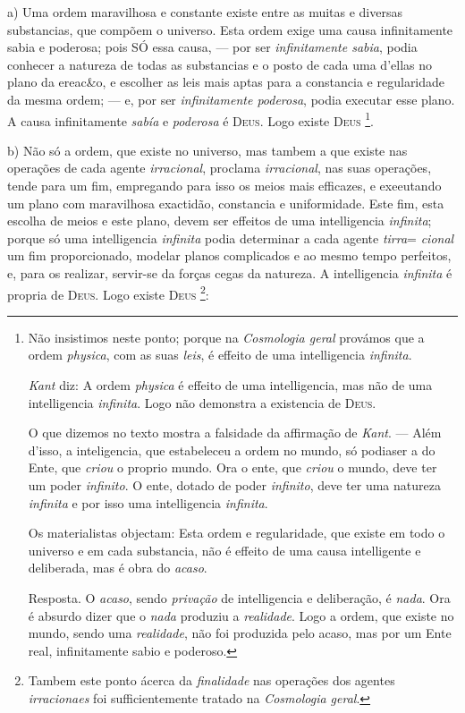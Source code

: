 a) Uma ordem maravilhosa e constante existe entre as muitas e diversas substancias, que compõem o universo. Esta ordem exige uma causa infinitamente sabia e poderosa; pois SÓ essa causa, --- por ser \emph{infinitamente sabia}, podia conhecer a natureza de todas as substancias e o posto de cada uma d'ellas no plano da ereac\&o, e escolher as leis mais aptas para a constancia e regularidade da mesma ordem; --- e, por ser \emph{infinitamente poderosa}, podia executar esse plano. A causa infinitamente \emph{sabía} e \emph{poderosa} é \textsc{Deus}. Logo existe \textsc{Deus} \footnote{Não insistimos neste ponto; porque na \emph{Cosmologia geral} provámos que a ordem \emph{physica}, com as suas \emph{leis}, é effeito de uma intelligencia \emph{infinita}.\par \emph{Kant} diz: A ordem \emph{physica} é effeito de uma intelligencia, mas não de uma intelligencia \emph{infinita}. Logo não demonstra a existencia de \textsc{Deus}.\par O que dizemos no texto mostra a falsidade da affirmação de \emph{Kant}. --- Além d'isso, a inteligencia, que estabeleceu a ordem no mundo, só podiaser a do Ente, que \emph{criou} o proprio mundo. Ora o ente, que \emph{criou} o mundo, deve ter um poder \emph{infinito}. O ente, dotado de poder \emph{infinito}, deve ter uma natureza \emph{infinita} e por isso uma intelligencia \emph{infinita}.\par Os materialistas objectam: Esta ordem e regularidade, que existe em todo o universo e em cada substancia, não é effeito de uma causa intelligente e deliberada, mas é obra do \emph{acaso}.\par Resposta. O \emph{acaso}, sendo \emph{privação} de intelligencia e deliberação, é \emph{nada}. Ora é absurdo dizer que o \emph{nada} produziu a \emph{realidade}. Logo a ordem, que existe no mundo, sendo uma \emph{realidade}, não foi produzida pelo acaso, mas por um Ente real, infinitamente sabio e poderoso.}.

b) Não só a ordem, que existe no universo, mas tambem a que existe nas operações de cada agente \emph{irracional}, proclama  \emph{irracional}, nas suas operações, tende para um fim, empregando para isso os meios mais efficazes, e exeeutando um plano com maravilhosa exactidão, constancia e uniformidade. Este fim, esta escolha de meios e este plano, devem ser effeitos de uma intelligencia \emph{infinita}; porque só uma intelligencia \emph{infinita} podia determinar a cada agente \emph{tirra}= \emph{cional} um fim proporcionado, modelar planos complicados e ao mesmo tempo perfeitos, e, para os realizar, servir-se da forças cegas da natureza. A intelligencia \emph{infinita} é propria de \textsc{Deus}. Logo existe \textsc{Deus} \footnote{Tambem este ponto ácerca da \emph{finalidade} nas operações dos agentes \emph{irracionaes} foi sufficientemente tratado na \emph{Cosmologia geral}.}:

